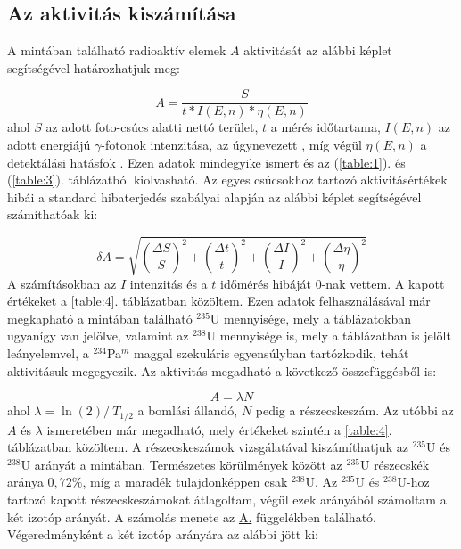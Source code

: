 \begin{multicols}{2}
\subsection{Az aktivitás kiszámítása}
A mintában található radioaktív elemek $A$ aktivitását az alábbi képlet segítségével határozhatjuk meg:

\begin{equation}
A
=
\frac{S}{t * I \left( E, n \right) * \eta \left( E, n \right)}
\end{equation}
ahol $S$ az adott foto-csúcs alatti nettó terület, $t$ a mérés időtartama, $I \left( E, n \right)$ az adott energiájú $\gamma$-fotonok intenzitása, az úgynevezett , míg végül $\eta \left( E, n \right)$ a detektálási hatásfok \citep{gamma_ray_spec}. \newline
Ezen adatok mindegyike ismert és az (\ref{table:1}). és (\ref{table:3}). táblázatból kiolvasható. Az egyes csúcsokhoz tartozó aktivitásértékek hibái a standard hibaterjedés szabályai alapján az alábbi képlet segítségével számíthatóak ki:

\begin{equation}
\delta A
=
\sqrt{
\left( \frac{\Delta S}{S} \right)^{2} + \left( \frac{\Delta t}{t} \right)^{2} + \left( \frac{\Delta I}{I} \right)^{2} + \left( \frac{\Delta \eta}{\eta} \right)^{2}
}
\end{equation}
A számításokban az $I$ intenzitás és a $t$ időmérés hibáját $0$-nak vettem. A kapott értékeket a \ref{table:4}. táblázatban közöltem. Ezen adatok felhasználásával már megkapható a mintában található $^{235}$U mennyisége, mely a táblázatokban ugyanígy van jelölve, valamint az $^{238}$U mennyisége is, mely a táblázatban is jelölt leányelemvel, a $^{234}$Pa$^{m}$ maggal szekuláris egyensúlyban tartózkodik, tehát aktivitásuk megegyezik. Az aktivitás megadható a következő összefüggésből is:

\begin{equation}
A = \lambda N
\end{equation}
ahol $\lambda = \ln \left( 2 \right) /\ T_{1/2}$ a bomlási állandó, $N$ pedig a részecskeszám. Az utóbbi az $A$ és $\lambda$ ismeretében már megadható, mely értékeket szintén a \ref{table:4}. táblázatban közöltem. A részecskeszámok vizsgálatával kiszámíthatjuk az $^{235}$U és $^{238}$U arányát a mintában. Természetes körülmények között az $^{235}$U részecskék aránya $0,72$\%, míg a maradék tulajdonképpen csak $^{238}$U. Az $^{235}$U és $^{238}$U-hoz tartozó kapott részecskeszámokat átlagoltam, végül ezek arányából számoltam a két izotóp arányát. A számolás menete az \hyperref[appendix:A]{A.} függelékben található. Végeredményként a két izotóp arányára az alábbi jött ki:


\end{multicols}
